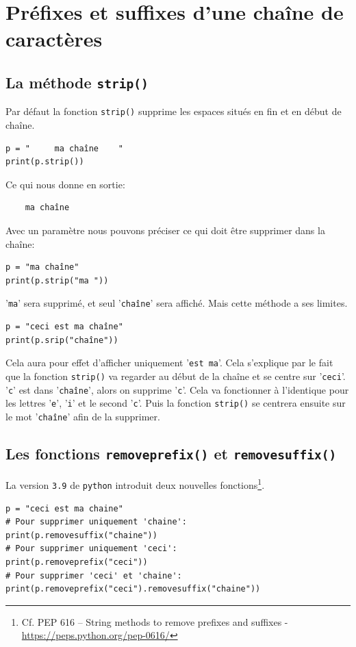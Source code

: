 \documentclass[a4paper,12pt]{book}
\begin{document}
\section{Préfixes et suffixes d'une chaîne de caractères}
\subsection*{La méthode \texttt{strip()}}
Par défaut la fonction \texttt{strip()} supprime les espaces situés en fin et en début de chaîne.
\begin{lstlisting}
p = "     ma chaîne    "
print(p.strip())
\end{lstlisting}
\medskip

Ce qui nous donne en sortie:
\begin{verbatim}
    ma chaîne
\end{verbatim}
\medskip

Avec un paramètre nous pouvons préciser ce qui doit être supprimer dans la chaîne:
\begin{lstlisting}
p = "ma chaîne"
print(p.strip("ma "))
\end{lstlisting}
\medskip

'\texttt{ma}' sera supprimé, et seul '\texttt{chaîne}' sera affiché. Mais cette méthode a ses limites.
\begin{lstlisting}
p = "ceci est ma chaîne"
print(p.srip("chaîne"))
\end{lstlisting}
\medskip

Cela aura pour effet d'afficher uniquement '\texttt{est ma}'. Cela s'explique par le fait que la fonction \texttt{strip()} va regarder au début de la chaîne et se centre sur '\texttt{ceci}'. '\texttt{c}' est dans '\texttt{chaîne}', alors on supprime '\texttt{c}'. Cela va fonctionner à l'identique pour les lettres '\texttt{e}', '\texttt{i}' et le second '\texttt{c}'. Puis la fonction \texttt{strip()} se centrera ensuite sur le mot '\texttt{chaîne}' afin de la supprimer.
\medskip

\subsection*{Les fonctions \texttt{removeprefix()} et \texttt{removesuffix()}}\label{prefix_suffix}
La version \texttt{3.9} de \texttt{python} introduit deux nouvelles fonctions\footnote{Cf. PEP 616 – String methods to remove prefixes and suffixes - \url{https://peps.python.org/pep-0616/}}.
\begin{lstlisting}
p = "ceci est ma chaine"
# Pour supprimer uniquement 'chaine':
print(p.removesuffix("chaine"))
# Pour supprimer uniquement 'ceci':
print(p.removeprefix("ceci"))
# Pour supprimer 'ceci' et 'chaine':
print(p.removeprefix("ceci").removesuffix("chaine"))
\end{lstlisting}
\medskip
\end{document}
